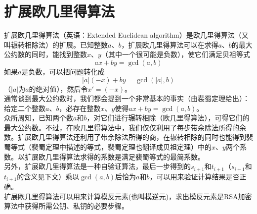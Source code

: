 \documentclass[UTF8]{ctexart}
\begin{document}
\section*{扩展欧几里得算法}
扩展欧几里得算法（英语：Extended Euclidean algorithm）是欧几里得算法（又叫辗转相除法）的扩展。已知整数$a$、$b$，扩展欧几里得算法可以在求得$a$、$b$的最大公约数的同时，能找到整数$x$、$y$（其中一个很可能是负数），使它们满足贝祖等式
\[ ax + by = \gcd(a,b) \]
如果$a$是负数，可以把问题转化成
\[ |a|(-x) + by = \gcd(|a|,b) \]
（$|a|$为$a$的绝对值），然后令$x' = (-x)$。\\
通常谈到最大公约数时，我们都会提到一个非常基本的事实（由裴蜀定理给出）：给定二个整数$a$、$b$，必存在整数$x$、$y$使得$ax + by = \gcd(a,b)$。\\
众所周知，已知两个数$a$和$b$，对它们进行辗转相除（欧几里得算法），可得它们的最大公约数。不过，在欧几里得算法中，我们仅仅利用了每步带余除法所得的余数。扩展欧几里得算法还利用了带余除法所得的商，在辗转相除的同时也能得到裴蜀等式（裴蜀定理中描述的等式，裴蜀定理也翻译成贝祖定理）中的$x$、$y$两个系数。以扩展欧几里得算法求得的系数是满足裴蜀等式的最简系数。\\
另外，扩展欧几里得算法是一种自验证算法，最后一步得到的$s_{i+1}$和$t_{i+1}$（$s_{i+1}$和$t_{i+1}$的含义见下文）乘以$\gcd(a,b)$后恰为$a$和$b$，可以用来验证计算结果是否正确。\\
扩展欧几里得算法可以用来计算模反元素(也叫模逆元)，求出模反元素是RSA加密算法中获得所需公钥、私钥的必要步骤。
\end{document}
